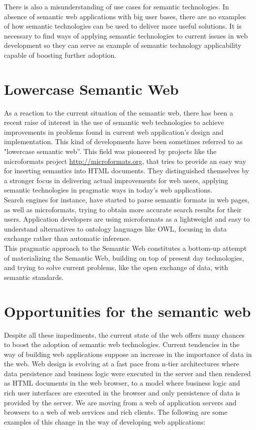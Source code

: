 There is also a misunderstanding of use cases for semantic technologies. In absence of semantic web applications with
big user bases, there are no examples of how semantic technologies can be used to deliver more useful solutions. It is
necessary to find ways of applying semantic technologies to current issues in web development so they can serve as
example of semantic technology applicability capable of boosting further adoption.


\section{Lowercase Semantic Web}

As a reaction to the current situation of the semantic web, there has been a recent raise of interest in the use of
semantic web technologies to achieve improvements in problems found in current web application's design and
implementation. This kind of developments have been sometimes referred to as "lowercase semantic web''. This field was pioneered
by projects like the microformats project \url{http://microformats.org}, that tries to provide an easy way for
inserting semantics into HTML documents. They distinguished themselves by a stronger focus in delivering actual
improvements for web users, applying semantic technologies in pragmatic ways in today's web applications.\\

Search engines for instance, have started to parse semantic formats in web pages, as well as microformats, trying to obtain more accurate search
results for their users. Application developers are using microformats as a lightweight and easy to understand
alternatives to ontology languages like OWL, focusing in data exchange rather than automatic inference. \\

This pragmatic approach to the Semantic Web constitutes a bottom-up attempt of materializing the Semantic Web, building on
top of present day technologies, and trying to solve current problems, like the open exchange of data, with semantic standards.

\section{Opportunities for the semantic web}

Despite all these impediments, the current state of the web offers many chances to boost the adoption of semantic web
technologies. Current tendencies in the way of building web applications suppose an increase in the importance of data in the web.  Web
design is evolving at a fast pace from n-tier architectures where data persistence and business logic  were executed in the server and then rendered as HTML documents in the web browser, to a
model where business logic and rich user interfaces are executed in the browser and only persistence of data is provided
by the server. We are moving from a web of application servers and browsers to a web of web services and rich clients.
The following are some examples of this change in the way of developing web applications:


